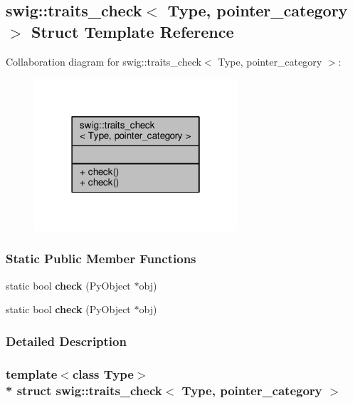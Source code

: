\subsection{swig\+:\+:traits\+\_\+check$<$ Type, pointer\+\_\+category $>$ Struct Template Reference}
\label{structswig_1_1traits__check_3_01Type_00_01pointer__category_01_4}


Collaboration diagram for swig\+:\+:traits\+\_\+check$<$ Type, pointer\+\_\+category $>$\+:
\nopagebreak
\begin{figure}[H]
\begin{center}
\leavevmode
\includegraphics[width=214pt]{d2/d98/structswig_1_1traits__check_3_01Type_00_01pointer__category_01_4__coll__graph}
\end{center}
\end{figure}
\subsubsection*{Static Public Member Functions}
\begin{DoxyCompactItemize}
\item 
static bool {\bf check} (Py\+Object $\ast$obj)
\item 
static bool {\bf check} (Py\+Object $\ast$obj)
\end{DoxyCompactItemize}


\subsubsection{Detailed Description}
\subsubsection*{template$<$class Type$>$\\*
struct swig\+::traits\+\_\+check$<$ Type, pointer\+\_\+category $>$}



